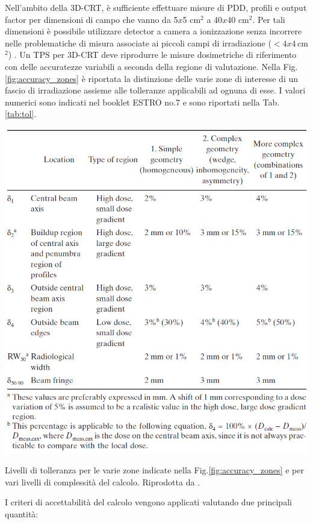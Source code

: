 Nell'ambito della 3D-CRT, è sufficiente effettuare misure di PDD, profili e output factor per dimensioni di campo che vanno da 5$x$5 cm$^2$ a 40$x$40 cm$^2$. Per tali dimensioni è possibile utilizzare detector a camera a ionizzazione senza incorrere nelle problematiche di misura associate ai piccoli campi di irradiazione ($< 4x4\,$cm$^2$) \cite{Das2008}. Un TPS per 3D-CRT deve riprodurre le misure dosimetriche di riferimento con delle accuratezze variabili a seconda della regione di valutazione. Nella Fig.\ref{fig:accuracy_zones} è riportata la distinzione  delle varie zone di interesse di un fascio di irradiazione assieme alle tolleranze applicabili ad ognuna di esse. I valori numerici sono indicati nel booklet ESTRO no.7 e sono riportati nella Tab.\ref{tab:tol}.\\
\begin{table}
\centering
\includegraphics[width=\textwidth]{./cap2/accuracy_tol.png}
\caption{Livelli di tolleranza per le varie zone indicate nella Fig.\ref{fig:accuracy_zones} e per vari livelli di complessità del calcolo. Riprodotta da \cite{Mijnheer2004}.}
\label{tab:tol}
\end{table}
I criteri di accettabilità del calcolo vengono applicati valutando due principali quantità:

